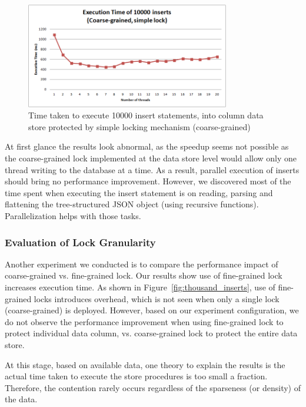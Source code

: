 \documentclass[11pt,journal,compsoc]{IEEEtran}
\begin{document}
\begin{figure}[!t]
\centering
\includegraphics[width=3.5in]{images/simple_lock}
\caption{Time taken to execute 10000 insert statements, into column data store protected by simple locking mechanism (coarse-grained) }
\label{fig:simple_lock}
\end{figure}


At first glance the results look abnormal, as the speedup seems not possible as the coarse-grained lock implemented at the data store level would allow only one thread writing to the database at a time. As a result, parallel execution of inserts should bring no performance improvement. However, we discovered most of the time spent when executing the insert statement is on reading, parsing and flattening the tree-structured JSON object (using recursive functions). Parallelization helps with those tasks.


\subsubsection{Evaluation of Lock Granularity}

Another experiment we conducted is to compare the performance impact of coarse-grained vs. fine-grained lock. Our results show use of fine-grained lock increases execution time. As shown in Figure~\ref{fig:thousand_inserts}, use of fine-grained locks introduces overhead, which is not seen when only a single lock (coarse-grained) is deployed. However, based on our experiment configuration, we do not observe the performance improvement when using fine-grained lock to protect individual data column, vs. coarse-grained lock to protect the entire data store.

 
At this stage, based on available data, one theory to explain the results is the actual time taken to execute the store procedures is too small a fraction. Therefore, the contention rarely occurs regardless of the sparseness (or density) of the data.
\end{document}
